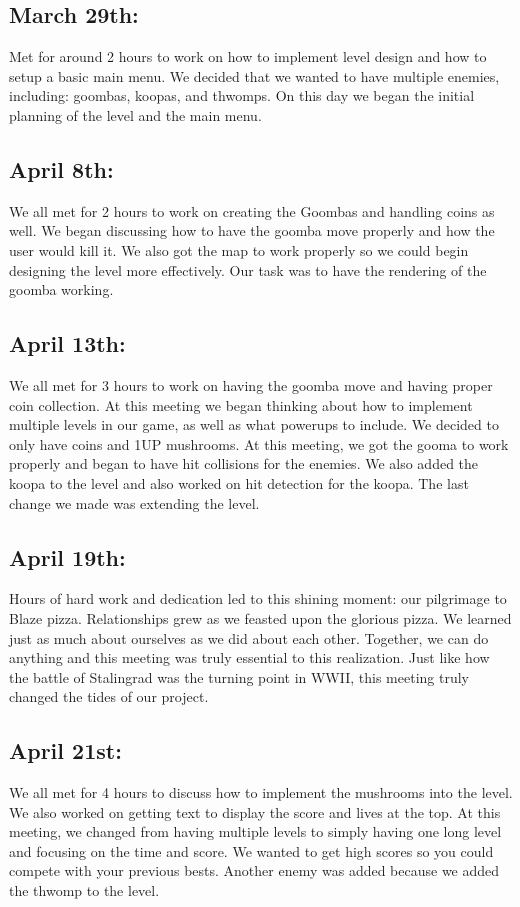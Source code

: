 \documentclass[letterpaper]{article}
\begin{document}
\subsection*{March 29th:}
Met for around 2 hours to work on how to implement level design and how to setup a basic main menu.  We decided that we wanted to have multiple enemies, including: goombas, koopas, and thwomps.  On this day we began the initial planning of the level and the main menu.

\subsection*{April 8th:}
We all met for 2 hours to work on creating the Goombas and handling coins as well. We began discussing how to have the goomba move properly and how the user would kill it.  We also got the map to work properly so we could begin designing the level more effectively.  Our task was to have the rendering of the goomba working.

\subsection*{April 13th:}
We all met for 3 hours to work on having the goomba move and having proper coin collection.  At this meeting we began thinking about how to implement multiple levels in our game, as well as what powerups to include.  We decided to only have coins and 1UP mushrooms.  At this meeting, we got the gooma to work properly and began to have hit collisions for the enemies.  We also added the koopa to the level and also worked on hit detection for the koopa. The last change we made was extending the level.

\subsection*{April 19th:}
Hours of hard work and dedication led to this shining moment: our pilgrimage to Blaze pizza.  Relationships grew as we feasted upon the glorious pizza.  We learned just as much about ourselves as we did about each other.  Together, we can do anything and this meeting was truly essential to this realization.  Just like how the battle of Stalingrad was the turning point in WWII, this meeting truly changed the tides of our project.

\subsection*{April 21st:}
We all met for 4 hours to discuss how to implement the mushrooms into the level.  We also worked on getting text to display the score and lives at the top.  At this meeting, we changed from having multiple levels to simply having one long level and focusing on the time and score.  We wanted to get high scores so you could compete with your previous bests.  Another enemy was added because we added the thwomp to the level.  
\end{document}
